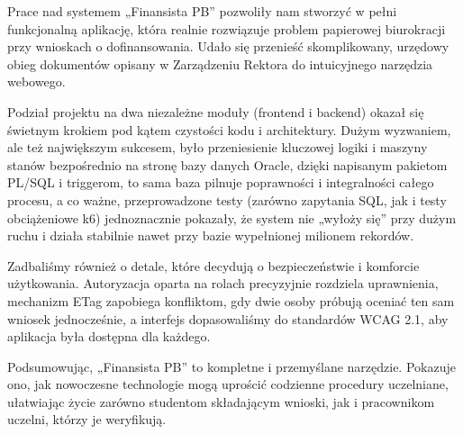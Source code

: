 \documentclass[12pt,a4paper]{article}
\begin{document}
Prace nad systemem „Finansista PB” pozwoliły nam stworzyć w pełni funkcjonalną aplikację, która realnie rozwiązuje problem papierowej biurokracji przy wnioskach o dofinansowania. Udało się przenieść skomplikowany, urzędowy obieg dokumentów opisany w Zarządzeniu Rektora do intuicyjnego narzędzia webowego.

Podział projektu na dwa niezależne moduły (frontend i backend) okazał się świetnym krokiem pod kątem czystości kodu i architektury. Dużym wyzwaniem, ale też największym sukcesem, było przeniesienie kluczowej logiki i maszyny stanów bezpośrednio na stronę bazy danych Oracle, dzięki napisanym pakietom PL/SQL i triggerom, to sama baza pilnuje poprawności i integralności całego procesu, a co ważne, przeprowadzone testy (zarówno zapytania SQL, jak i testy obciążeniowe k6) jednoznacznie pokazały, że system nie „wyłoży się” przy dużym ruchu i działa stabilnie nawet przy bazie wypełnionej milionem rekordów.

Zadbaliśmy również o detale, które decydują o bezpieczeństwie i komforcie użytkowania. Autoryzacja oparta na rolach precyzyjnie rozdziela uprawnienia, mechanizm ETag zapobiega konfliktom, gdy dwie osoby próbują oceniać ten sam wniosek jednocześnie, a interfejs dopasowaliśmy do standardów WCAG 2.1, aby aplikacja była dostępna dla każdego.

Podsumowując, „Finansista PB” to kompletne i przemyślane narzędzie. Pokazuje ono, jak nowoczesne technologie mogą uprościć codzienne procedury uczelniane, ułatwiając życie zarówno studentom składającym wnioski, jak i pracownikom uczelni, którzy je weryfikują.
\end{document}
